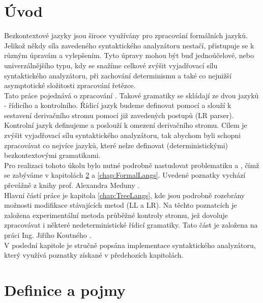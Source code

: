 
\chapter{Úvod}

Bezkontextové jazyky jsou široce využívány pro zpracování formálních jazyků.
Jelikož někdy síla zavedeného syntaktického analyzátoru nestačí, přistupuje
se k různým úpravám a vylepšením.
Tyto úpravy mohou být buď jednoúčelové, nebo univerzálnějšího typu, kdy
se snažíme celkové zvýšit vyjadřovací sílu syntaktického analyzátoru,
při zachování determinismu a také co nejnižší asymptotické složitosti
zpracování řetězce.\\

Tato práce pojednává o zpracování .
Takové gramatiky se skládají ze dvou jazyků - řídicího a kontrolního.
Řídicí jazyk budeme definovat pomocí  a
slouží k sestavení derivačního stromu pomocí již zavedených postupů
(LR parser).
Kontrolní jazyk definujeme  a poslouží k
omezení derivačního stromu. Cílem je zvýšit vyjadřovací sílu
syntaktického analyzátoru, tak abychom byli schopni zpracovávat co
nejvíce jazyků, které nelze definovat (deterministickými) bezkontextovými
gramatikami.\\

Pro realizaci tohoto úkolu bylo nutné podrobně nastudovat problematiku
 a , čímž se zabýváme
v kapitolách \ref{chap:Definitions} a \ref{chap:FormalLangs}. Uvedené
poznatky vychází převážně z knihy prof. Alexandra Meduny \cite{MedunaIFJ}.\\

Hlavní částí práce je kapitola \ref{chap:TreeLangs}, kde jsou podrobně rozebrány
možnosti modifikace stávajících metod (LL a LR). Na těchto poznatcích je
založena experimentální metoda
průběžné kontroly stromu, jež dovoluje zpracovávat i některé nedeterministické
řídicí gramatiky. Tato část je založena na práci Ing. Jiřího Koutného
\cite{Koutny}.\\

V poslední kapitole je stručně popsána implementace syntaktického analyzátoru,
který využívá poznatky získané v předchozích kapitolách.


\chapter{Definice a pojmy}
\label{chap:Definitions}

